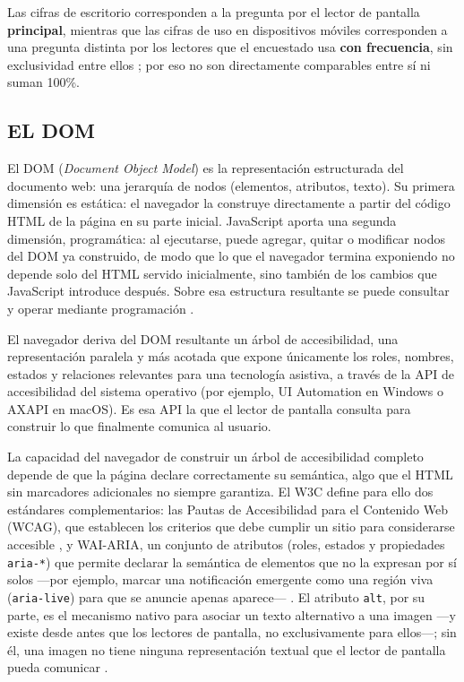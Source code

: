 Las cifras de escritorio corresponden a la pregunta por el lector de pantalla \textbf{principal}, mientras que las cifras de uso en dispositivos móviles corresponden a una pregunta distinta por los lectores que el encuestado usa \textbf{con frecuencia}, sin exclusividad entre ellos \cite{webaim2024screenreadersurvey10}; por eso no son directamente comparables entre sí ni suman 100\%.

\subsection{EL DOM}

El DOM (\textit{Document Object Model}) es la representación estructurada del documento web: una jerarquía de nodos (elementos, atributos, texto). Su primera dimensión es estática: el navegador la construye directamente a partir del código HTML de la página en su parte inicial. JavaScript aporta una segunda dimensión, programática: al ejecutarse, puede agregar, quitar o modificar nodos del DOM ya construido, de modo que lo que el navegador termina exponiendo no depende solo del HTML servido inicialmente, sino también de los cambios que JavaScript introduce después. Sobre esa estructura resultante se puede consultar y operar mediante programación \cite{whatwgdom}.

El navegador deriva del DOM resultante un árbol de accesibilidad, una representación paralela y más acotada que expone únicamente los roles, nombres, estados y relaciones relevantes para una tecnología asistiva, a través de la API de accesibilidad del sistema operativo (por ejemplo, UI Automation en Windows o AXAPI en macOS). Es esa API la que el lector de pantalla consulta para construir lo que finalmente comunica al usuario.

La capacidad del navegador de construir un árbol de accesibilidad completo depende de que la página declare correctamente su semántica, algo que el HTML sin marcadores adicionales no siempre garantiza. El W3C define para ello dos estándares complementarios: las Pautas de Accesibilidad para el Contenido Web (WCAG), que establecen los criterios que debe cumplir un sitio para considerarse accesible \cite{wcag22}, y WAI-ARIA, un conjunto de atributos (roles, estados y propiedades \texttt{aria-*}) que permite declarar la semántica de elementos que no la expresan por sí solos —por ejemplo, marcar una notificación emergente como una región viva (\texttt{aria-live}) para que se anuncie apenas aparece— \cite{waiaria2023}. El atributo \texttt{alt}, por su parte, es el mecanismo nativo para asociar un texto alternativo a una imagen —y existe desde antes que los lectores de pantalla, no exclusivamente para ellos—; sin él, una imagen no tiene ninguna representación textual que el lector de pantalla pueda comunicar \cite{w3caltimages}.

